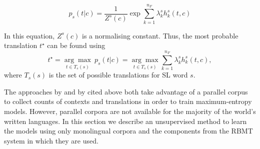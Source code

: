 \documentclass[11pt]{article}
\newcommand{\todomlf}[1]{\renewcommand{\baselinestretch}{0.55}\todo{\scriptsize\sf MLF: #1}\renewcommand{\baselinestretch}{1.0}}
\begin{document}
\begin{equation}
p_s(t|c) = \frac{1}{Z^s(c)} \exp{ \sum_{k=1}^{n_F} \lambda_k^s h_k^s(t, c)}
\label{eq:max-ent-sum}
\end{equation}

In this equation, $Z^s(c)$ is a normalising constant. Thus, the most
probable translation \(t^\star\) can be found using
\begin{equation}
  t^\star=\underset{t \in T_s(s)}{\arg\max} ~ p_s(t|c) = \underset{t \in T_s(s)}{\arg\max} \sum_{k=1}^{n_F} \lambda_k^s h_k^s(t, c) ,
\label{eq:max-ent-max}
\end{equation}
where $T_s(s)$ is the set of possible translations for SL word $s$.

The approaches by \cite{berger1996} and by \cite{marechek10} cited
above both take advantage of a parallel corpus to collect counts of
contexts and translations in order to train maximum-entropy
models. However, parallel corpora are not available for the majority
of the world's written languages. In this section we describe an
unsupervised method to learn the models using only monolingual corpora
and the components from the RBMT system in which they are
used. 
\end{document}
